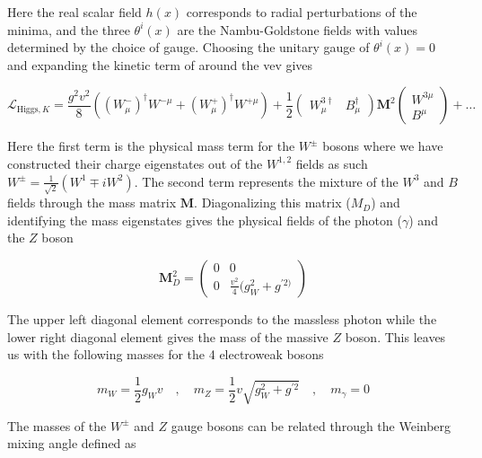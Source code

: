 Here the real scalar field $h(x)$ corresponds to radial perturbations of the
minima, and the three $\theta^{i}(x)$ are the Nambu-Goldstone fields with
values determined by the choice of gauge.  Choosing the unitary gauge of
$\theta^{i}(x) = 0$ and expanding the kinetic term of
 around the vev gives

\begin{equation} \label{eq:higgs:boson_masses}
\mathcal{L}_{\text{Higgs},K} = \frac{g^{2}v^{2}}{8} \left(
(W_{\mu}^{-})^{\dagger}W^{-\mu} + (W_{\mu}^{+})^{\dagger}W^{+\mu} \right) +
\frac{1}{2} \left( \begin{matrix} W_{\mu}^{3\dagger} & B_{\mu}^{\dagger}
\end{matrix} \right) \boldsymbol{M}^{2} \left( \begin{matrix} W^{3\mu} \\ B^{\mu}
\end{matrix} \right) + \ldots 
\end{equation}

Here the first term is the physical mass term for the $W^{\pm}$ bosons where we
have constructed their charge eigenstates out of the $W^{1,2}$ fields as such
$W^{\pm} = \frac{1}{\sqrt{2}}(W^{1} \mp iW^{2})$.  The second term represents the
mixture of the $W^{3}$ and $B$ fields through the mass matrix $\boldsymbol{M}$.
Diagonalizing this matrix ($M_{D}$) and identifying the mass eigenstates gives the
physical fields of the photon ($\gamma$) and the $Z$ boson


\begin{equation}
\boldsymbol{M}_{D}^{2} = \left( \begin{matrix} 0 & 0 \\ 0 &
\frac{v^{2}}{4}(g_{W}^{2} + g^{'2)}   \end{matrix} \right)
\end{equation}

The upper left diagonal element corresponds to the massless photon
while the lower right diagonal element gives the mass of the massive $Z$ boson.
This leaves us with the following masses for the 4 electroweak bosons

\begin{equation}
m_{W} = \frac{1}{2}g_{W}v \quad , \quad m_Z = \frac{1}{2}v\sqrt{g_{W}^{2} + g^{'2}}
\quad , \quad m_\gamma = 0
\end{equation}

The masses of the $W^{\pm}$ and $Z$ gauge bosons can be related through the
Weinberg mixing angle defined as

